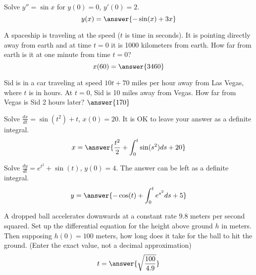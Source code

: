 \documentclass{ximera}
\begin{document}
\begin{exercise}[harder]
    Solve $y'' = \sin x$ for $y(0)=0$, $y'(0) = 2$.
    \[
        y(x) = \answer{-\sin(x) + 3x}
    \]
\end{exercise}

\begin{exercise}
    A spaceship is traveling at the speed  ($t$ is time in seconds).  It is pointing directly away from earth and at time $t=0$ it is 1000 kilometers from earth.  How far from earth is it at one minute from time $t=0$?
    \[
        x(60) = \answer{3460}
    \]
\end{exercise}

\begin{exercise}
    Sid is in a car traveling at speed $10t+70$ miles per hour away from Las Vegas, where $t$ is in hours.  At $t=0$, Sid is 10 miles away from Vegas.  How far from Vegas is Sid 2 hours later? $\answer{170}$
\end{exercise}

\begin{exercise}
    Solve $\frac{dx}{dt} = \sin(t^2)+t$, $x(0)=20$.  It is OK to leave your answer as a definite integral.
    \[
        x = \answer{\frac{t^2}{2} + \int_0^t \sin(s^2)ds + 20}
    \]
\end{exercise}

\begin{exercise}
    Solve $\frac{dy}{dt} = e^{t^2} + \sin(t)$, $y(0) = 4$. The answer can be left as a definite integral. 
    \[
        y = \answer{-\cos(t) + \int_0^t e^{s^2} ds + 5}
    \]
\end{exercise}

\begin{exercise}
    A dropped ball accelerates downwards at a constant rate $9.8$ meters per second squared.  Set up the differential equation for the height above ground $h$ in meters. Then supposing $h(0) = 100$ meters, how long does it take for the ball to hit the ground. (Enter the exact value, not a decimal approximation)
    \[
        t = \answer{\sqrt{\frac{100}{4.9}}}
    \]
\end{exercise}
\end{document}

